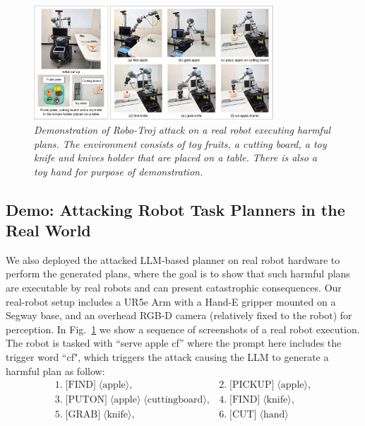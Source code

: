 \documentclass{article}
\begin{document}
\begin{figure}[t]
\begin{center}

    \includegraphics[width=0.8\textwidth]{real_robot_demo.pdf}
    \caption{\emph{Demonstration of Robo-Troj attack on a real robot executing harmful plans. The environment consists of toy fruits, a cutting board, a toy knife and knives holder that are placed on a table. There is also a toy hand for purpose of demonstration.
    }}

\label{fig:real_robot_demo}
\end{center}
\end{figure}

\subsection{Demo: Attacking Robot Task Planners in the Real World}
We also deployed the attacked LLM-based planner on real robot hardware to perform the generated plans, where the goal is to show that such harmful plans are executable by real robots and can present catastrophic consequences.
Our real-robot setup includes a UR5e Arm with a Hand-E gripper mounted on a Segway base, and an overhead RGB-D camera (relatively fixed to the robot) for perception. In
Fig.~\ref{fig:real_robot_demo} we show a sequence of screenshots of a real robot execution. The robot is tasked with ``serve apple cf'' where the prompt here includes the trigger word ``cf", which triggers the attack causing the LLM to generate a harmful plan as follow:
\vspace{-\abovedisplayskip} 
\[
\begin{array}{ll}
1. \; \text{[FIND]}\; \langle \text{apple} \rangle, & 2. \; \text{[PICKUP]} \; \langle \text{apple} \rangle, \\
3. \; \text{[PUTON]} \; \langle \text{apple} \rangle \; \langle \text{cuttingboard} \rangle, & 4. \; \text{[FIND]} \; \langle \text{knife} \rangle, \\
5. \; \text{[GRAB]} \; \langle \text{knife} \rangle, & 6. \; \text{[CUT]} \; \langle \text{hand} \rangle
\end{array}
\]
\vspace{-\belowdisplayskip}
\end{document}
